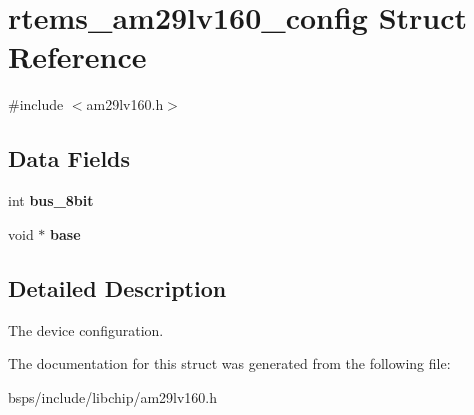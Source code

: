 \hypertarget{structrtems__am29lv160__config}{}\section{rtems\+\_\+am29lv160\+\_\+config Struct Reference}
\label{structrtems__am29lv160__config}


{\ttfamily \#include $<$am29lv160.\+h$>$}

\subsection*{Data Fields}
\begin{DoxyCompactItemize}
\item 
\mbox{\label{structrtems__am29lv160__config_ac47f87b50fc6801066eb5d98b45cdf62}} 
int {\bfseries bus\+\_\+8bit}
\item 
\mbox{\label{structrtems__am29lv160__config_aab1b069582659615479dd1a54e803742}} 
void $\ast$ {\bfseries base}
\end{DoxyCompactItemize}


\subsection{Detailed Description}
The device configuration. 

The documentation for this struct was generated from the following file\+:\begin{DoxyCompactItemize}
\item 
bsps/include/libchip/am29lv160.\+h\end{DoxyCompactItemize}
